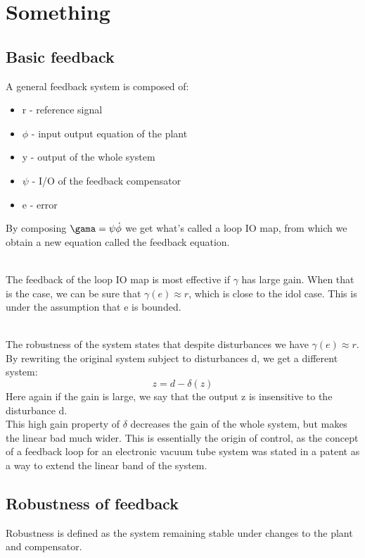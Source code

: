 \chapter{Something}
\section{Basic feedback}

A general feedback system is composed of:
\begin{itemize}
        \item r - reference signal
        \item $\phi$ - input output equation of the plant
        \item y - output of the whole system
        \item  $\psi$ - I/O of the feedback compensator
        \item e - error
        
\end{itemize}
By composing $\gama = \psi \dot \phi$ we get what's called a loop IO map, from which we obtain a new
equation called the feedback equation.


\\
The feedback of the loop IO map is most effective if  $\gamma$ has large gain.
When that is the case, we can be sure that $\gamma(e) \approx r$, which is close to the idol case.
This is under the assumption that e is bounded.

\\
The robustness of the system states that despite disturbances we have  $\gamma(e) \approx r$.
By rewriting the original system subject to disturbances d, we get a different system:
 \begin{equation}
    z = d - \delta(z)
\end{equation}
Here again if the gain is large, we say that the output z is insensitive to the disturbance d.
\\
This high gain property  of $\delta$ decreases the gain of the whole system, but makes the linear
bad much wider. This is essentially the origin of control, as the concept of a feedback loop for
an electronic vacuum tube system was stated in a patent as a way to extend the linear band of the
system. 

\section{Robustness of feedback}
Robustness is defined as the system remaining stable under changes to the plant and compensator.

